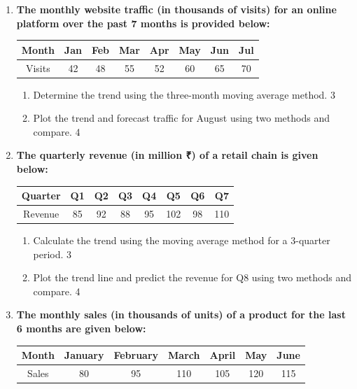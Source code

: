 \documentclass[a4paper,oneside]{book}
\begin{document}
\begin{enumerate}
\item
\textbf{The monthly website traffic (in thousands of visits) for an online platform over the past 7 months is provided below:}

\begin{table}[h]
\centering
\begin{tabular}{cccccccc}
Month & Jan & Feb & Mar & Apr & May & Jun & Jul \\ \hline
Visits & 42 & 48 & 55 & 52 & 60 & 65 & 70 \\
\end{tabular}
\end{table}

\begin{enumerate}
\item
Determine the trend using the three-month moving average method. \hfill 3
\item
Plot the trend and forecast traffic for August using two methods 
and compare. \hfill 4
\end{enumerate}

\item
\textbf{The quarterly revenue (in million ₹) of a retail chain is given below:}

\begin{table}[h]
\centering
\begin{tabular}{cccccccc}
Quarter & Q1 & Q2 & Q3 & Q4 & Q5 & Q6 & Q7 \\ \hline
Revenue & 85 & 92 & 88 & 95 & 102 & 98 & 110 \\
\end{tabular}
\end{table}

\begin{enumerate}
\item
Calculate the trend using the moving average method for a 3-quarter period. \hfill 3
\item
Plot the trend line and predict the revenue for Q8 using two methods 
and compare. \hfill 4
\end{enumerate}
  
  \item
\textbf{The monthly sales (in thousands of units) of a product for the last 6 months are given below:}

\begin{table}[h]
\centering
\begin{tabular}{ccccccc}
Month     & January & February & March & April & May & June \\ \hline
Sales     & 80      & 95       & 110   & 105   & 120  & 115  \\
\end{tabular}
\end{table}


\end{enumerate}
\end{document}
